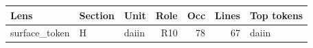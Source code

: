 {\small
\begin{tabular}{lllrrrl}
\toprule
Lens & Section & Unit & Role & Occ & Lines & Top tokens \\
\midrule
surface\_token & H & daiin & R10 & 78 & 67 & daiin \\
\bottomrule
\end{tabular}
}
